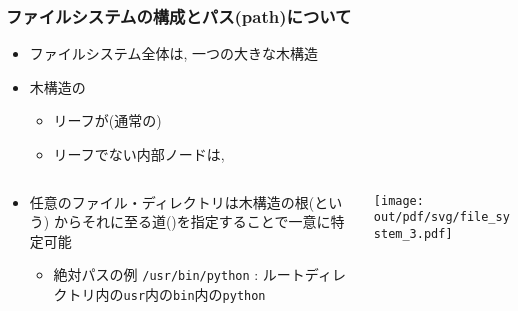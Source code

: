 \documentclass[12pt,dvipdfmx]{beamer}
\begin{document}
\begin{frame}
  \frametitle{ファイルシステムの構成とパス(path)について}
  \begin{itemize}
  \item ファイルシステム全体は, 一つの大きな木構造
  \item 木構造の
    \begin{itemize}
    \item リーフが(通常の)
    \item リーフでない内部ノードは, 
    \end{itemize}
  \end{itemize}
  \begin{columns}
    \begin{column}{0.65\textwidth}
      \begin{itemize}
      \item 任意のファイル・ディレクトリは木構造の根(という)
        からそれに至る道()を指定することで一意に特定可能
        \begin{itemize}
        \item 絶対パスの例 {\tt /usr/bin/python} : ルートディレクトリ内の{\tt usr}内の{\tt bin}内の{\tt python}
        \end{itemize}
      \end{itemize}      
    \end{column}
    \begin{column}{0.35\textwidth}
      \begin{center}
        \texttt{[image: out/pdf/svg/file\_system\_3.pdf]}
      \end{center}
    \end{column}
  \end{columns}
\end{frame}
\end{document}
